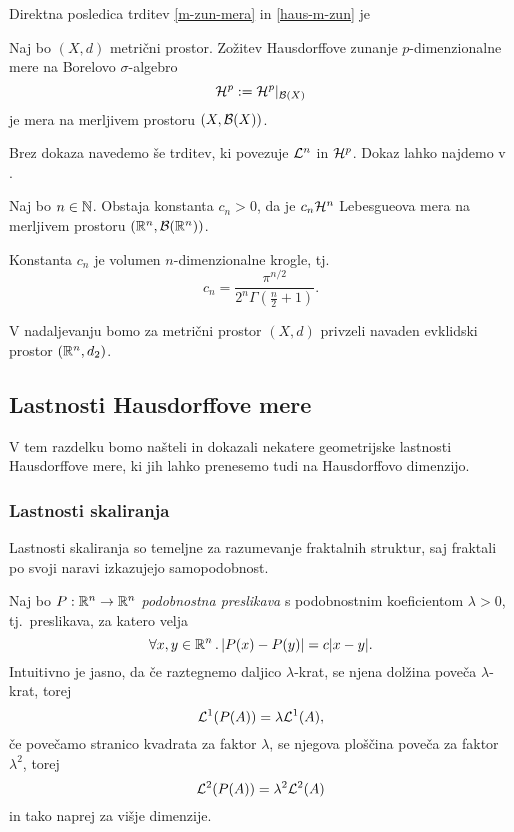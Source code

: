 Direktna posledica trditev \ref{m-zun-mera} in \ref{haus-m-zun} je
\begin{posledica}
    Naj bo \((X, d)\) metrični prostor. Zožitev Hausdorffove zunanje \(p\)-dimenzionalne mere na Borelovo \(\sigma\)-algebro 
    \[\mathcal{H}^p := \mathcal{H}^p|_{\mathcal{B}(X)}\]
    je mera na merljivem prostoru \((X,\mathcal{B}(X))\).
\end{posledica}

Brez dokaza navedemo še trditev, ki povezuje \(\mathcal{L}^n\) in \(\mathcal{H}^p\). Dokaz lahko najdemo v \cite[stran 351]{f-ra}.
\begin{trditev}
    \label{haus-leb}
    Naj bo \(n \in \mathbb{N}\). Obstaja konstanta \(c_n > 0\), da je \(c_n \mathcal{H}^n\) Lebesgueova mera na merljivem prostoru \((\mathbb{R}^n, \mathcal{B}(\mathbb{R}^n))\).
\end{trditev}

\begin{opomba}
    Konstanta \(c_n\) je volumen \(n\)-dimenzionalne krogle, tj. 
    \[c_n = \frac{\pi^{n/2}}{2^n \Gamma(\frac{n}{2} + 1)}.\]
\end{opomba}

\noindent V nadaljevanju bomo za metrični prostor \((X, d)\)  privzeli navaden evklidski prostor \((\mathbb{R}^n, d_2)\).

\subsection{Lastnosti Hausdorffove mere}
V tem razdelku bomo našteli in dokazali nekatere geometrijske lastnosti Hausdorffove mere, ki jih lahko prenesemo tudi na Hausdorffovo dimenzijo.

\subsubsection{Lastnosti skaliranja}
Lastnosti skaliranja so temeljne za razumevanje fraktalnih struktur, saj fraktali po svoji naravi izkazujejo samopodobnost. 

Naj bo \(P: \mathbb{R}^n \to \mathbb{R}^n\) \emph{podobnostna preslikava} s podobnostnim koeficientom \(\lambda > 0\), tj.\ preslikava, za katero velja
\[\forall x, y \in \mathbb{R}^n \,.\, |P(x) - P(y)| = c|x - y|.\]
%
Intuitivno je jasno, da če raztegnemo daljico \(\lambda\)-krat, se njena dolžina poveča \(\lambda\)-krat, torej 
\[\mathcal{L}^1(P(A)) = \lambda\mathcal{L}^1(A),\]
če povečamo stranico kvadrata za faktor \(\lambda\), se njegova ploščina poveča za faktor \(\lambda^2\), torej 
\[\mathcal{L}^2(P(A)) = \lambda^2\mathcal{L}^2(A)\]
in tako naprej za višje dimenzije.

